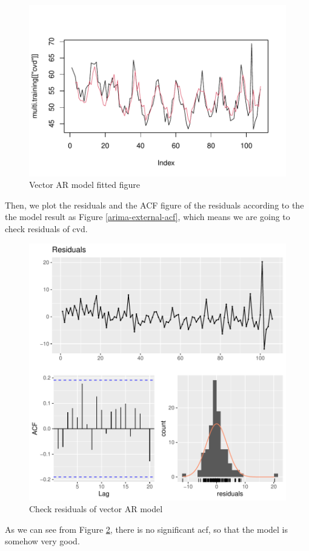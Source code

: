 \documentclass{article}
\begin{document}
\vspace{-15pt}
\begin{figure}[H]
    \centering
    \includegraphics[width=0.65\linewidth]{images/var-fit}
    \caption{Vector AR model fitted figure}
    \label{var-fit}
\end{figure}
Then, we plot the residuals and the ACF figure of the residuals according to the the model result as Figure \ref{arima-external-acf}, which means we are going to check residuals of cvd.
\begin{figure}[H]
    \centering
    \includegraphics[width=0.58\linewidth]{images/var-acf}
    \caption{Check residuals of vector AR model}
    \label{var-acf}
\end{figure}
As we can see from Figure \ref{var-acf}, there is no significant acf, so that the model is somehow very good. 
\end{document}
